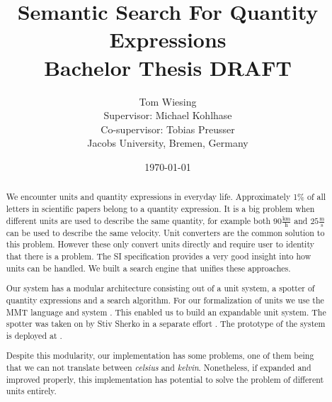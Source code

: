 \documentclass[11pt]{article}
\title{Semantic Search For Quantity Expressions\\ \vspace{2 mm} Bachelor Thesis DRAFT\ednote{Remove draft status}}
\author{Tom Wiesing\\Supervisor: Michael Kohlhase\\Co-supervisor: Tobias Preusser\\Jacobs University, Bremen, Germany}
\date{\today}
\begin{document}
\maketitle

\begin{abstract}


  We encounter units and quantity expressions in everyday life. Approximately 1\% of all letters in scientific papers belong to a quantity expression. It is a big problem when different units are used to describe the same quantity, for example both $90 \frac{\text{km}}{\text{h}}$ and $25 \frac{\text{m}}{\text{s}}$ can be used to describe the same velocity. Unit converters are the common solution to this problem. However these only convert units directly and require user to identity that there is a problem. The SI specification \cite{sispec} provides a very good insight into how units can be handled. We built a search engine that unifies these approaches.

  Our system has a modular architecture consisting out of a unit system, a spotter of quantity expressions and a search algorithm. For our formalization of units we use the MMT language and system \cite{RabKoh:WSMSML13}. This enabled us to build an expandable unit system. The spotter was taken on by Stiv Sherko in a separate effort \cite{thesis:sharko}. The prototype of the system is deployed at \cite{self:sqesdemo}.

  Despite this modularity, our implementation has some problems, one of them being that we can not translate between \textit{celsius} and \textit{kelvin}. Nonetheless, if expanded and improved properly, this implementation has potential to solve the problem of different units entirely. 

\end{abstract}
\end{document}
